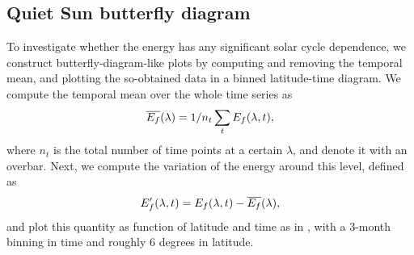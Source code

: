 \documentclass{aa}
\begin{document}
\subsection{Quiet Sun \fff butterfly diagram}\label{qsf}


To investigate whether the \fff energy has any significant solar cycle dependence, we construct butterfly-diagram-like plots by computing and removing the temporal mean, and plotting the so-obtained data in a binned latitude-time diagram. 
We compute the temporal mean over the whole time series as 
\begin{equation}
    \overline{E_f}(\lambda) = 1/n_t \sum_t E_f(\lambda,t),
\end{equation}
where $n_t$ is the total number of time points at a certain $\lambda$, and denote it with an overbar. Next, we compute the variation of the \fff energy around this level, defined as
\begin{equation}
    E_f'(\lambda,t)=E_f(\lambda,t)-\overline{E_f}(\lambda),
\end{equation}
and plot this quantity as function of latitude and time as in , with a 3-month binning in time and roughly 6 degrees in latitude. 
\end{document}
